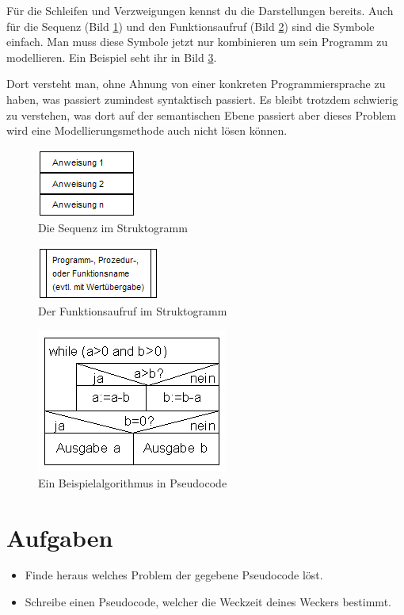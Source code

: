Für die Schleifen und Verzweigungen kennst du die Darstellungen bereits. Auch für die Sequenz (Bild \ref{sequenz}) und den Funktionsaufruf (Bild \ref{call}) sind die Symbole einfach. Man muss diese Symbole jetzt nur kombinieren um sein Programm zu modellieren. Ein Beispiel seht ihr in Bild \ref{example}.

Dort versteht man, ohne Ahnung von einer konkreten Programmiersprache zu haben, was passiert zumindest syntaktisch passiert. Es bleibt trotzdem schwierig zu verstehen, was dort auf der semantischen Ebene passiert aber dieses Problem wird eine Modellierungsmethode auch nicht lösen können.

\begin{figure}
	\begin{center}\includegraphics[scale=1]{images/sequenz}\end{center}
	\caption{Die Sequenz im Struktogramm}
	\label{sequenz}
\end{figure}

\begin{figure}
	\begin{center}\includegraphics[scale=1]{images/call}\end{center}
	\caption{Der Funktionsaufruf im Struktogramm}
	\label{call}
\end{figure}

\begin{figure}
	\begin{center}\includegraphics[scale=0.75]{images/example}\end{center}
	\caption{Ein Beispielalgorithmus in Pseudocode}
	\label{example}
\end{figure}

\section{Aufgaben}

\begin{itemize}
	\item Finde heraus welches Problem der gegebene Pseudocode löst.
	\item Schreibe einen Pseudocode, welcher die Weckzeit deines Weckers bestimmt.
\end{itemize}